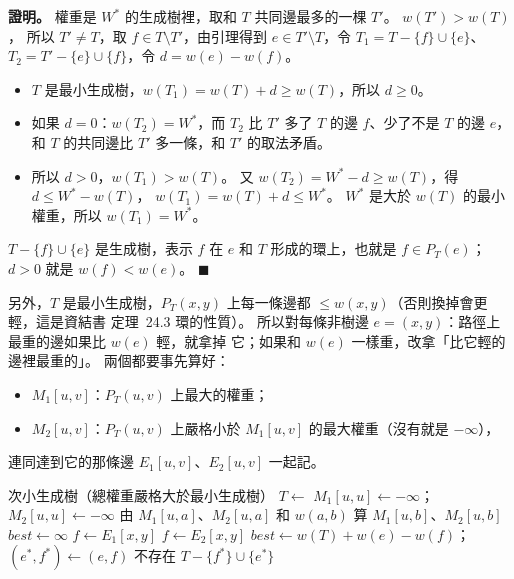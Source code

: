 \begin{pastsoln}
\textbf{證明。} 權重是 $W^{*}$ 的生成樹裡，取和 $T$ 共同邊最多的一棵 $T'$。 $w(T') > w(T)$，
所以 $T' \ne T$，取 $f \in T \setminus T'$，由引理得到 $e \in T' \setminus T$，令
$T_1 = T - \{f\} \cup \{e\}$、$T_2 = T' - \{e\} \cup \{f\}$，令 $d = w(e) - w(f)$。
\begin{itemize}
\item $T$ 是最小生成樹，$w(T_1) = w(T) + d \ge w(T)$，所以 $d \ge 0$。
\item 如果 $d = 0$：$w(T_2) = W^{*}$，而 $T_2$ 比 $T'$ 多了 $T$ 的邊 $f$、少了不是 $T$ 的邊 $e$，
和 $T$ 的共同邊比 $T'$ 多一條，和 $T'$ 的取法矛盾。
\item 所以 $d > 0$，$w(T_1) > w(T)$。 又 $w(T_2) = W^{*} - d \ge w(T)$，得 $d \le W^{*} - w(T)$，
$w(T_1) = w(T) + d \le W^{*}$。 $W^{*}$ 是大於 $w(T)$ 的最小權重，所以 $w(T_1) = W^{*}$。
\end{itemize}
$T - \{f\} \cup \{e\}$ 是生成樹，表示 $f$ 在 $e$ 和 $T$ 形成的環上，也就是 $f \in P_T(e)$；
$d > 0$ 就是 $w(f) < w(e)$。 \hfill$\blacksquare$

另外，$T$ 是最小生成樹，$P_T(x, y)$ 上每一條邊都 $\le w(x, y)$（否則換掉會更輕，這是資結書
定理~24.3 環的性質）。 所以對每條非樹邊 $e = (x, y)$：路徑上最重的邊如果比 $w(e)$ 輕，就拿掉
它；如果和 $w(e)$ 一樣重，改拿「比它輕的邊裡最重的」。 兩個都要事先算好：
\begin{itemize}
\item $M_1[u, v]$：$P_T(u, v)$ 上最大的權重；
\item $M_2[u, v]$：$P_T(u, v)$ 上嚴格小於 $M_1[u, v]$ 的最大權重（沒有就是 $-\infty$），
\end{itemize}
連同達到它的那條邊 $E_1[u, v]$、$E_2[u, v]$ 一起記。

\begin{pseudo}{次小生成樹（總權重嚴格大於最小生成樹）}
    \State $T \gets$  
     
        \State $M_1[u, u] \gets -\infty$；$M_2[u, u] \gets -\infty$
            \State 由 $M_1[u, a]$、$M_2[u, a]$ 和 $w(a, b)$ 算 $M_1[u, b]$、$M_2[u, b]$ 
        \EndFor
    \EndFor
    \State $\mathit{best} \gets \infty$
            \State $f \gets E_1[x, y]$
        \Else
            \State $f \gets E_2[x, y]$ 
        \EndIf
            \State $\mathit{best} \gets w(T) + w(e) - w(f)$；$(e^{*}, f^{*}) \gets (e, f)$
        \EndIf
    \EndFor
        \State \Return 不存在 
    \EndIf
    \State \Return $T - \{f^{*}\} \cup \{e^{*}\}$
\EndFunction
\end{pseudo}


\end{pastsoln}
